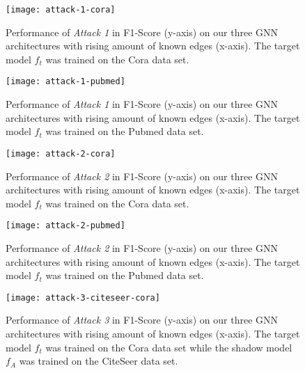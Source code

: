     \begin{figure}[h]
      \begin{center}
        \texttt{[image: attack-1-cora]}
        \caption[Attack 1 - $D_{f_t} = Cora$]{Performance of \emph{Attack 1} in F1-Score (y-axis) on our three GNN architectures with rising amount of known edges (x-axis). The target model $f_t$ was trained on the Cora data set.}
        \label{figure:eval-att1-cora}
      \end{center}
    \end{figure}

    \begin{figure}[h]
      \begin{center}
        \texttt{[image: attack-1-pubmed]}
        \caption[Attack 1 - $D_{f_t} = Pubmed$]{Performance of \emph{Attack 1} in F1-Score (y-axis) on our three GNN architectures with rising amount of known edges (x-axis). The target model $f_t$ was trained on the Pubmed data set.}
        \label{figure:eval-att1-pubmed}
      \end{center}
    \end{figure}

    \begin{figure}[h]
      \begin{center}
          \texttt{[image: attack-2-cora]}
          \caption[Attack 2 - $D_{f_t} = Cora$]{Performance of \emph{Attack 2} in F1-Score (y-axis) on our three GNN architectures with rising amount of known edges (x-axis). The target model $f_t$ was trained on the Cora data set.}
          \label{figure:eval-att2-cora}
      \end{center}
    \end{figure}

    \begin{figure}[h]
      \begin{center}
          \texttt{[image: attack-2-pubmed]}
          \caption[Attack 2 - $D_{f_t} = Pubmed$]{Performance of \emph{Attack 2} in F1-Score (y-axis) on our three GNN architectures with rising amount of known edges (x-axis). The target model $f_t$ was trained on the Pubmed data set.}
          \label{figure:eval-att2-pubmed}
      \end{center}
    \end{figure}

    \begin{figure}[h]
      \begin{center}
          \texttt{[image: attack-3-citeseer-cora]}
          \caption[Attack 3 - $D_{f_t} = Cora$ and $D_A = CiteSeer$]{Performance of \emph{Attack 3} in F1-Score (y-axis) on our three GNN architectures with rising amount of known edges (x-axis). The target model $f_t$ was trained on the Cora data set while the shadow model $f_A$ was trained on the CiteSeer data set.}
          \label{figure:eval-att3-citeseer-cora}
      \end{center}
  \end{figure}

